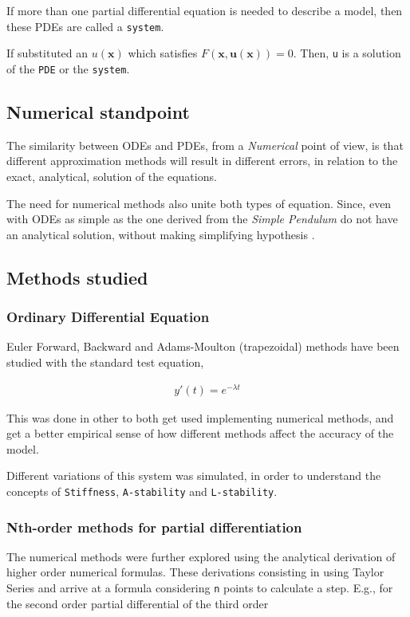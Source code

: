 \documentclass[11pt]{article}
\begin{document}
If more than one partial differential equation is needed to describe a model,
then these PDEs are called a \texttt{system}.

If substituted an \(u(\mathbf{x})\) which satisfies
\(F(\mathbf{x},\mathbf{u(x)})=0\). Then, \texttt{u} is a solution of the \texttt{PDE} or the
\texttt{system}.

\subsection{Numerical standpoint}
\label{sec:org8ec9b4b}
The similarity between ODEs and PDEs, from a \emph{Numerical} point of view, is
that different approximation methods will result in different errors,
in relation to the exact, analytical, solution of the equations.

The need for numerical methods also unite both types of
equation. Since, even with ODEs as simple as the one derived from the
\emph{Simple Pendulum} do not have an analytical solution, without making simplifying
hypothesis \cite{brauer1989qualitative}.

\subsection{Methods studied}
\label{sec:orgf56c5b1}

\subsubsection{Ordinary Differential Equation}
\label{sec:org51fcba8}
Euler Forward, Backward and Adams-Moulton (trapezoidal) methods have been
studied with the standard test equation,

\begin{equation}
\begin{aligned}
y'(t)=e^{- \lambda{}t}
\end{aligned}
\end{equation}

This was done in other to both get used implementing numerical methods, and get
a better empirical sense of how different methods affect the accuracy of the
model.

Different variations of this system was simulated, in order to understand the
concepts of \texttt{Stiffness}, \texttt{A-stability} and \texttt{L-stability}.

\subsubsection{Nth-order methods for partial differentiation}
\label{sec:orgc4a6eea}
The numerical methods were further explored using the analytical derivation of
higher order numerical formulas. These derivations consisting in using Taylor
Series and arrive at a formula considering \texttt{n} points to calculate a step. E.g.,
for the second order partial differential of the third order
\end{document}
